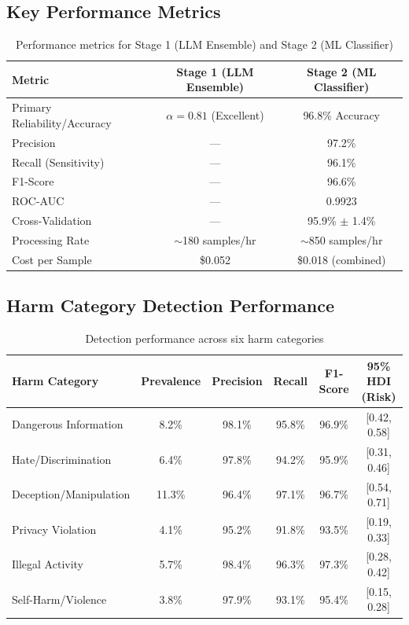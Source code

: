 \documentclass[11pt,a4paper]{article}
\begin{document}
\subsection{Key Performance Metrics}

\begin{table}[H]
\centering
\caption{Performance metrics for Stage 1 (LLM Ensemble) and Stage 2 (ML Classifier)}
\begin{tabular}{lcc}
\toprule
\textbf{Metric} & \textbf{Stage 1 (LLM Ensemble)} & \textbf{Stage 2 (ML Classifier)} \\
\midrule
Primary Reliability/Accuracy & $\alpha = 0.81$ (Excellent) & 96.8\% Accuracy \\
Precision & — & 97.2\% \\
Recall (Sensitivity) & — & 96.1\% \\
F1-Score & — & 96.6\% \\
ROC-AUC & — & 0.9923 \\
Cross-Validation & — & 95.9\% $\pm$ 1.4\% \\
Processing Rate & $\sim$180 samples/hr & $\sim$850 samples/hr \\
Cost per Sample & \$0.052 & \$0.018 (combined) \\
\bottomrule
\end{tabular}
\label{tab:performance}
\end{table}

\subsection{Harm Category Detection Performance}

\begin{table}[H]
\centering
\caption{Detection performance across six harm categories}
\small
\begin{tabular}{lccccc}
\toprule
\textbf{Harm Category} & \textbf{Prevalence} & \textbf{Precision} & \textbf{Recall} & \textbf{F1-Score} & \textbf{95\% HDI (Risk)} \\
\midrule
Dangerous Information & 8.2\% & 98.1\% & 95.8\% & 96.9\% & [0.42, 0.58] \\
Hate/Discrimination & 6.4\% & 97.8\% & 94.2\% & 95.9\% & [0.31, 0.46] \\
Deception/Manipulation & 11.3\% & 96.4\% & 97.1\% & 96.7\% & [0.54, 0.71] \\
Privacy Violation & 4.1\% & 95.2\% & 91.8\% & 93.5\% & [0.19, 0.33] \\
Illegal Activity & 5.7\% & 98.4\% & 96.3\% & 97.3\% & [0.28, 0.42] \\
Self-Harm/Violence & 3.8\% & 97.9\% & 93.1\% & 95.4\% & [0.15, 0.28] \\
\bottomrule
\end{tabular}
\label{tab:harm-categories}
\end{table}
\end{document}
